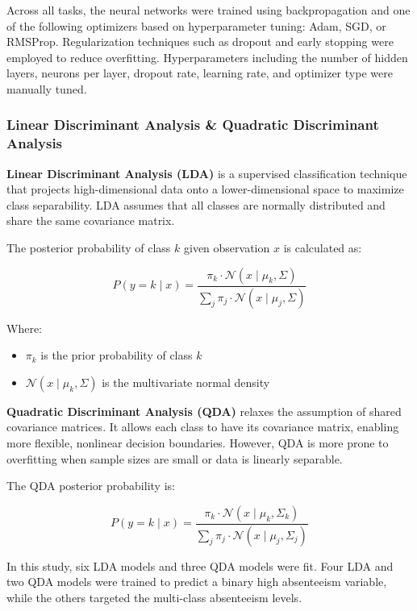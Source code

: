 \documentclass[
  11pt,
]{article}
\begin{document}
Across all tasks, the neural networks were trained using backpropagation
and one of the following optimizers based on hyperparameter tuning:
Adam, SGD, or RMSProp. Regularization techniques such as dropout and
early stopping were employed to reduce overfitting. Hyperparameters
including the number of hidden layers, neurons per layer, dropout rate,
learning rate, and optimizer type were manually tuned.

\subsubsection{Linear Discriminant Analysis \& Quadratic Discriminant
Analysis}\label{linear-discriminant-analysis-quadratic-discriminant-analysis}

\textbf{Linear Discriminant Analysis (LDA)} is a supervised
classification technique that projects high-dimensional data onto a
lower-dimensional space to maximize class separability. LDA assumes that
all classes are normally distributed and share the same covariance
matrix.

The posterior probability of class \(k\) given observation \(x\) is
calculated as:

\[
P(y = k \mid x) = \frac{\pi_k \cdot \mathcal{N}(x \mid \mu_k, \Sigma)}{\sum_j \pi_j \cdot \mathcal{N}(x \mid \mu_j, \Sigma)}
\]

Where:

\begin{itemize}
\item
  \(\pi_k\) is the prior probability of class \(k\)
\item
  \(\mathcal{N}(x \mid \mu_k, \Sigma)\) is the multivariate normal
  density
\end{itemize}

\textbf{Quadratic Discriminant Analysis (QDA)} relaxes the assumption of
shared covariance matrices. It allows each class to have its covariance
matrix, enabling more flexible, nonlinear decision boundaries. However,
QDA is more prone to overfitting when sample sizes are small or data is
linearly separable.

The QDA posterior probability is:

\[
P(y = k \mid x) = \frac{\pi_k \cdot \mathcal{N}(x \mid \mu_k, \Sigma_k)}{\sum_j \pi_j \cdot \mathcal{N}(x \mid \mu_j, \Sigma_j)}
\]

In this study, six LDA models and three QDA models were fit. Four LDA
and two QDA models were trained to predict a binary high absenteeism
variable, while the others targeted the multi-class absenteeism levels.
\end{document}
